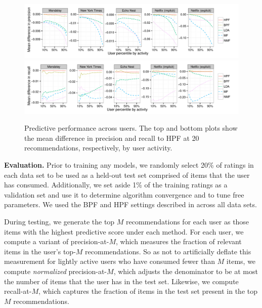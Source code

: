 \begin{figure}[t!]
\centering
\includegraphics[width=\textwidth]{figures/mean_diff_precision_at_20_by_user_percentile.pdf}\\
\includegraphics[width=\textwidth]{figures/mean_diff_recall_at_20_by_user_percentile.pdf}\\
\caption{Predictive performance across users. The top and bottom plots show the
  mean difference in precision and recall to HPF at 20 recommendations,
  respectively, by user activity.}
\label{fig:precision_recall_by_user_activity}
\end{figure}

{\bf Evaluation.} Prior to training any models, we randomly select
20\% of ratings in each data set to be used as a held-out test set
comprised of items that the user has consumed. Additionally, we set
aside 1\% of the training ratings as a validation set and use it to
determine algorithm convergence and to tune free parameters. We used
the BPF and HPF settings described in  across all
data sets.

During testing, we generate the top $M$ recommendations for each user
as those items with the highest predictive score under each
method. For each user, we compute a variant of precision-at-$M$, which
measures the fraction of relevant items in the user's top-$M$
recommendations. So as not to artificially deflate this measurement
for lightly active users who have consumed fewer than $M$ items, we
compute {\it normalized} precision-at-$M$, which adjusts the
denominator to be at most the number of items that the user has in the
test set. Likewise, we compute recall-at-$M$, which captures the
fraction of items in the test set present in the top $M$
recommendations.


